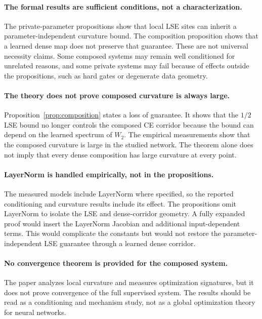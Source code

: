 \paragraph{The formal results are sufficient conditions, not a
characterization.}
The private-parameter propositions show that local LSE sites can inherit a
parameter-independent curvature bound. The composition proposition shows that
a learned dense map does not preserve that guarantee. These are not universal
necessity claims. Some composed systems may remain well conditioned for
unrelated reasons, and some private systems may fail because of effects
outside the propositions, such as hard gates or degenerate data geometry.

\paragraph{The theory does not prove composed curvature is always large.}
Proposition~\ref{prop:composition} states a loss of guarantee. It shows that
the $1/2$ LSE bound no longer controls the composed CE corridor because the
bound can depend on the learned spectrum of $W_2$. The empirical measurements
show that the composed curvature is large in the studied network. The theorem
alone does not imply that every dense composition has large curvature at every
point.

\paragraph{LayerNorm is handled empirically, not in the propositions.}
The measured models include LayerNorm where specified, so the reported
conditioning and curvature results include its effect. The propositions omit
LayerNorm to isolate the LSE and dense-corridor geometry. A fully expanded
proof would insert the LayerNorm Jacobian and additional input-dependent
terms. This would complicate the constants but would not restore the
parameter-independent LSE guarantee through a learned dense corridor.

\paragraph{No convergence theorem is provided for the composed system.}
The paper analyzes local curvature and measures optimization signatures, but
it does not prove convergence of the full supervised system. The results
should be read as a conditioning and mechanism study, not as a global
optimization theory for neural networks.


